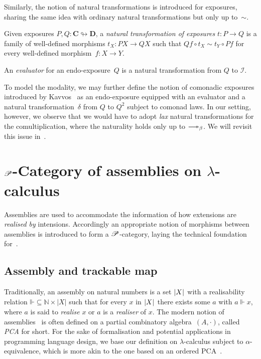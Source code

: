 \documentclass[a4paper,UKenglish,numberwithinsect,cleveref,thm-restate,draft]{lipics-v2021}
\numberwithin{equation}{section}
\theoremstyle{definition}
\theoremstyle{plain}
\begin{document}
Similarly, the notion of natural transformations is introduced for exposures, sharing the same idea with ordinary natural transformations but only up to~$\sim$.
\begin{definition}
  Given exposures $P, Q\colon \mathbf{C} \looparrowright \mathbf{D}$, a \emph{natural transformation of exposures} $t\colon P \to Q$ is a family of well-defined morphisms $t_X \colon PX \to QX$ such that $Qf \circ t_X \sim t_Y \circ Pf$ for every well-defined morphism~$f\colon X \to Y$. 
\end{definition}
An \emph{evaluator} for an endo-exposure~$Q$ is a natural transformation from $Q$ to $\mathcal{I}$.

To model the \SFour modality, we may further define the notion of comonadic exposures introduced by Kavvos~\cite{Kavvos2017b} as an endo-exposure equipped with an evaluator and a natural transformation~$\delta$ from $Q$ to $Q^2$ subject to comonad laws.
In our setting, however, we observe that we would have to adopt \emph{lax} natural transformations for the comultiplication, where the naturality holds only up to $\reduce$.
We will revisit this issue in~.

\section{\texorpdfstring{$\mathscr{P}$}{P}-Category of assemblies on \texorpdfstring{$\lambda$}{λ}-calculus}\label{sec:assemblies}

Assemblies are used to accommodate the information of how extensions are \emph{realised by} intensions.
Accordingly an appropriate notion of morphisms between assemblies is introduced to form a $\mathscr{P}$-category, laying
the technical foundation for~.


\subsection{Assembly and trackable map}
Traditionally, an assembly on natural numbers is a set $\mathopen{}\left|X\right|_{}^{}\mathclose{}$ with a realisability relation $\mathord{\Vdash} \subseteq \mathbb{N} \times |X|$ such that for every $x$ in $\mathopen{}\left|X\right|_{}^{}\mathclose{}$ there exists some $a$ with $a \Vdash x$, where $a$ is said to \emph{realise} $x$ or $a$ is a \emph{realiser} of $x$.
The modern notion of assemblies~\cite{Oosten2008} is often defined on a partial  combinatory algebra~$(A, \cdot)$, called \emph{PCA} for short.
For the sake of formalisation and potential applications in programming language design, we base our definition on $\lambda$-calculus subject to $\alpha$-equivalence, which is more akin to the one based on an ordered PCA~\cite{Hofstra2003}. 
\end{document}
